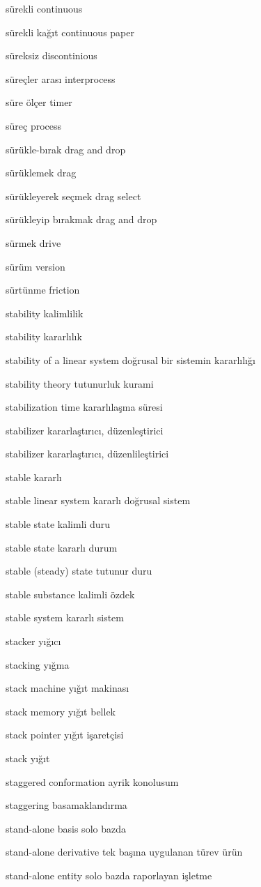 \documentclass[12pt,fleqn]{article}\usepackage{../../common}
\begin{document}
sürekli continuous

sürekli kağıt continuous paper

süreksiz discontinious

süreçler arası interprocess

süre ölçer timer

süreç process

sürükle-bırak drag and drop

sürüklemek drag

sürükleyerek seçmek drag select

sürükleyip bırakmak drag and drop

sürmek drive

sürüm version

sürtünme friction

stability kalimlilik

stability kararlılık

stability of a linear system doğrusal bir sistemin kararlılığı

stability theory tutunurluk kurami

stabilization time kararlılaşma süresi

stabilizer kararlaştırıcı, düzenleştirici

stabilizer kararlaştırıcı, düzenlileştirici

stable kararlı

stable linear system kararlı doğrusal sistem

stable state kalimli duru

stable state kararlı durum

stable (steady) state tutunur duru

stable substance kalimli özdek

stable system kararlı sistem

stacker yığıcı

stacking yığma

stack machine yığıt makinası

stack memory yığıt bellek

stack pointer yığıt işaretçisi

stack yığıt

staggered conformation ayrik konolusum

staggering basamaklandırma

stand-alone basis solo bazda

stand-alone derivative tek başına uygulanan türev ürün

stand-alone entity solo bazda raporlayan işletme
\end{document}
